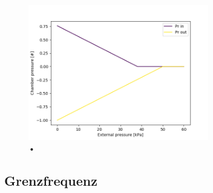 \documentclass[fontsize=12pt, a4paper]{scrartcl}
\begin{document}
\begin{figure}[H]
	\centering
	\includegraphics[width=0.7\textwidth]{bilder/backpressure/backpressure_result.png}
	\caption{•}
\end{figure}

\subsection{Grenzfrequenz}
\end{document}
